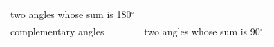{\begin{tabular}[t]{|l|l|l|}
    \multicolumn{2}{c|}{two angles whose sum is 180\begin{math}{}^{\circ }\end{math}}
     \tabularnewline\cline{1-1}\cline{2-2}\cline{3-3}
        complementary angles &
    \multicolumn{2}{c|}{two angles whose sum is 90\begin{math}{}^{\circ }\end{math}}
     \tabularnewline\cline{1-1}\cline{2-2}\cline{3-3}
    \end{tabular}} %
